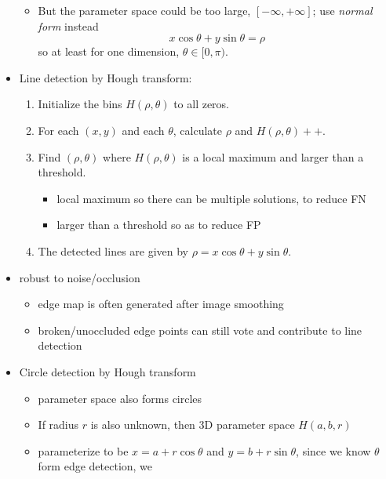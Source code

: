 \documentclass[twocolumn,landscape,10pt]{article}
\theoremstyle{definition}
\begin{document}
\begin{itemize}
\begin{itemize}
            \item But the parameter space could be too large,
                $[-\infty,+\infty]$; use \emph{normal
                form} instead
                \[
                    x\cos{\theta}+y\sin{\theta}=\rho
                \]
                so at least for one dimension, $\theta\in[0,\pi)$.
        \end{itemize} 
    \item Line detection by Hough transform:
        \begin{enumerate}
            \item Initialize the bins $H(\rho,\theta)$ to all zeros.
            \item For each $(x,y)$ and each $\theta$, calculate $\rho$ and
                $H(\rho,\theta)++$.
            \item Find $(\rho,\theta)$ where $H(\rho,\theta)$ is a local maximum
                and larger than a threshold.
                \begin{itemize}
                    \item local maximum so there can be multiple solutions, to
                        reduce FN
                    \item larger than a threshold so as to reduce FP
                \end{itemize} 
            \item The detected lines are given by
                $\rho=x\cos{\theta}+y\sin{\theta}$.
        \end{enumerate} 
    \item robust to noise/occlusion
        \begin{itemize}
            \item edge map is often generated after image smoothing
            \item broken/unoccluded edge points can still 
                vote and contribute to line detection
        \end{itemize} 
    \item Circle detection by Hough transform
        \begin{itemize}
            \item  parameter space also forms circles
            \item If radius $r$ is also unknown, then 3D parameter space
                $H(a,b,r)$
            \item parameterize to be $x = a+r\cos{\theta}$ and $y =
                b+r\sin{\theta}$, since we know $\theta$ form edge detection, we

\end{itemize}
\end{itemize}
\end{document}
